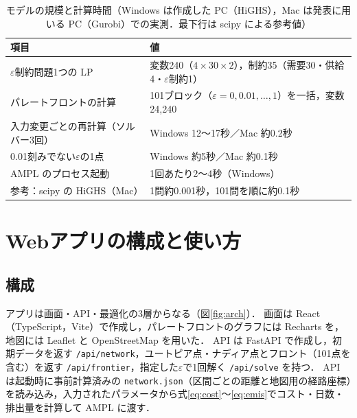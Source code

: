\documentclass[a4paper,11pt]{ltjsarticle}
\begin{document}
\begin{table}[tbp]
\centering\small
\caption{モデルの規模と計算時間（Windows は作成した PC（HiGHS），Mac は発表に用いる PC（Gurobi）での実測．最下行は scipy による参考値）}\label{tab:size}
\begin{tabular}{ll}
\toprule
項目 & 値 \\
\midrule
$\varepsilon$制約問題1つの LP & 変数240（$4\times30\times2$），制約35（需要30・供給4・$\varepsilon$制約1） \\
パレートフロントの計算 & 101ブロック（$\varepsilon=0,0.01,\dots,1$）を一括，変数24,240 \\
\midrule
入力変更ごとの再計算（ソルバー3回） & Windows 12〜17秒／Mac 約0.2秒 \\
0.01刻みでない$\varepsilon$の1点 & Windows 約5秒／Mac 約0.1秒 \\
AMPL のプロセス起動 & 1回あたり2〜4秒（Windows） \\
\midrule
参考：scipy の HiGHS（Mac） & 1問約0.001秒，101問を順に約0.1秒 \\
\bottomrule
\end{tabular}
\end{table}

\section{Webアプリの構成と使い方}\label{sec:app}
\subsection{構成}
アプリは画面・API・最適化の3層からなる（図\ref{fig:arch}）．
画面は React（TypeScript，Vite）で作成し，パレートフロントのグラフには Recharts を，地図には Leaflet と OpenStreetMap を用いた．
API は FastAPI で作成し，初期データを返す \texttt{/api/network}，ユートピア点・ナディア点とフロント（101点を含む）を返す \texttt{/api/frontier}，指定した$\varepsilon$で1回解く \texttt{/api/solve} を持つ．
API は起動時に事前計算済みの \texttt{network.json}（区間ごとの距離と地図用の経路座標）を読み込み，入力されたパラメータから式\eqref{eq:cost}〜\eqref{eq:emis}でコスト・日数・排出量を計算して AMPL に渡す．
\end{document}
